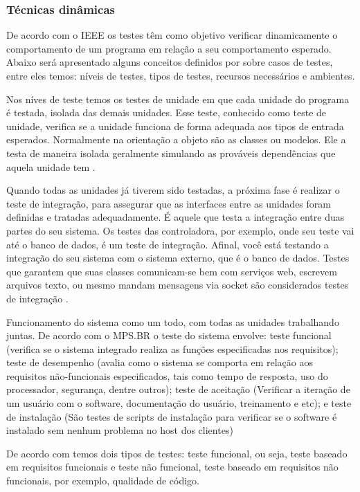 \subsubsection{Técnicas dinâmicas}

De acordo com o IEEE os testes têm como objetivo verificar dinamicamente o comportamento de um programa em relação
a seu comportamento esperado. Abaixo será apresentado alguns conceitos definidos por \cite{myers} sobre casos de testes,
entre eles temos: níveis de testes, tipos de testes, recursos necessários e ambientes.

Nos níves de teste temos os testes de unidade em que cada unidade do programa é testada, isolada das demais unidades.
Esse teste, conhecido como teste de unidade, verifica se a unidade funciona de forma adequada aos tipos de entrada
esperados. Normalmente na orientação a objeto são as classes ou modelos. Ele a testa de maneira isolada geralmente
simulando as prováveis dependências que aquela unidade tem \cite{myers}.

Quando todas as unidades já tiverem sido testadas, a próxima fase é realizar o teste de integração, para assegurar que
as interfaces entre as unidades foram definidas e tratadas adequadamente. É aquele que testa a integração entre duas
partes do seu sistema. Os testes das controladora, por exemplo, onde seu teste vai até o banco de dados, é um teste de
integração. Afinal, você está testando a integração do seu sistema com o sistema externo, que é o banco de dados. Testes
que garantem que suas classes comunicam-se bem com serviços web, escrevem arquivos texto, ou mesmo mandam mensagens via
socket são considerados testes de integração \cite{myers}.

Funcionamento do sistema como um todo, com todas as unidades trabalhando juntas. De acordo com o MPS.BR o teste do
sistema envolve: teste funcional (verifica se o sistema integrado realiza as funções especificadas nos requisitos);
teste de desempenho (avalia como o sistema se comporta em relação aos requisitos não-funcionais especificados, tais como
tempo de resposta, uso do processador, segurança, dentre outros); teste de aceitação (Verificar a iteração de um usuário
com o software, documentação do usuário, treinamento e etc); e teste de instalação (São testes de scripts de instalação
para verificar se o software é instalado sem nenhum problema no host dos clientes) \cite{myers}

De acordo com \cite{myers} temos dois tipos de testes: teste funcional, ou seja, teste baseado em requisitos
funcionais e teste não funcional, teste baseado em requisitos não funcionais, por exemplo, qualidade de código.

